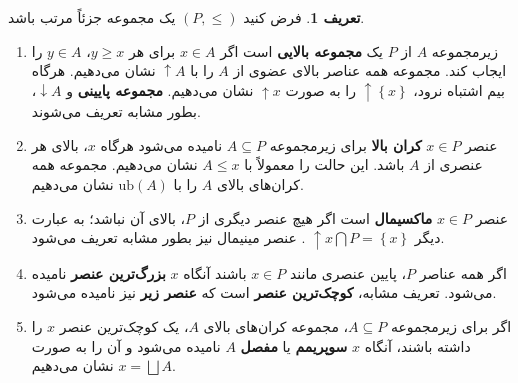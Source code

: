 \documentclass[12pt,a4paper]{article}
\theoremstyle{definition}
\newtheorem{definition}{تعریف}[section]
\theoremstyle{theorem}
\theoremstyle{definition}
\begin{document}
\begin{definition}
فرض کنید
$ (P,\leq) $
یک مجموعه جزئاً مرتب باشد.
\begin{enumerate}
\item 
زیرمجموعه 
$ A $
از 
$ P $
یک \textbf{مجموعه بالایی} 
است 
اگر 
$ x\in A $
برای هر
$ y\geq x $، 
$ y\in A $
را ایجاب کند.  مجموعه همه عناصر بالای عضوی از 
$ A $
را با
$ \uparrow A $
نشان می‌دهیم.   هرگاه بیم اشتباه نرود،  
$ \uparrow \left\lbrace x\right\rbrace  $
را به صورت 
$ \uparrow x $
نشان می‌دهیم.  \textbf{مجموعه پایینی} و 
$ \downarrow A $، بطور مشابه تعریف می‌شوند.
\item
عنصر
$ x\in P $
\textbf{کران بالا}
 برای زیرمجموعه 
$ A\subseteq P $
نامیده می‌شود هرگاه 
$ x $، بالای هر عنصری از 
$ A $
باشد. این حالت را معمولاً با 
$ A\leq x $
نشان می‌دهیم.  مجموعه همه کران‌های بالای 
$ A $
را با 
$ \mathrm{ub}(A) $
نشان می‌دهیم.
\item
عنصر 
$ x\in P $
\textbf{ماکسیمال}
است اگر هیچ عنصر دیگری از 
$ P $،  بالای آن نباشد؛ به عبارت دیگر
$ \uparrow x \bigcap P=\left\lbrace x\right\rbrace  $%
. عنصر مینیمال 
نیز بطور مشابه تعریف می‌شود.
\item
اگر همه عناصر
$ P $، پایین عنصری مانند
$ x\in P $
باشند آنگاه 
$ x $
\textbf{بزرگ‌ترین عنصر}
 نامیده می‌شود.   تعریف مشابه، 
\textbf{کوچک‌ترین عنصر}
 است که 
 \textbf{عنصر زیر}
 نیز نامیده می‌شود.
\item
اگر برای زیرمجموعه 
$ A\subseteq P $، مجموعه کران‌های بالای $ A $، یک کوچک‌ترین عنصر 
$ x $
را داشته باشند،  آنگاه
$ x $
\textbf{سوپریمم}
یا
\textbf{مفصل}
$ A $ نامیده می‌شود و آن را به صورت 
$ x=\bigsqcup A $
نشان می‌دهیم.
\end{enumerate}
\end{definition}
\end{document}
